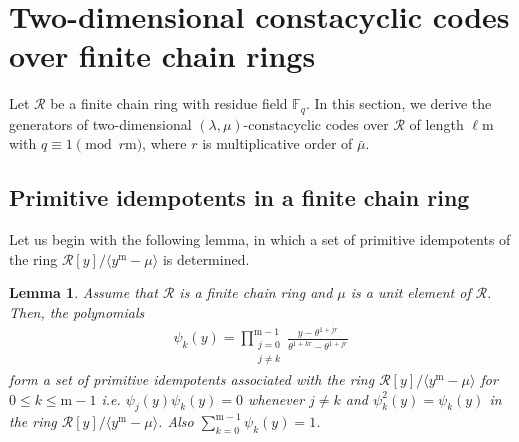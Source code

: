 \documentclass[12pt,a4paper]{article}
\newtheorem{lemma}[theorem]{Lemma}
\begin{document}
\section{Two-dimensional constacyclic codes over finite chain rings}
Let $\mathcal{R}$ be a finite chain ring with residue field $\mathbb{F}_q$. In this section, we derive the generators of two-dimensional $(\lambda,\mu)$-constacyclic codes over $\mathcal{R}$ of length $\ell\mathrm{m}$ with $q\equiv 1 \pmod{r\mathrm{m}}$, where $r$ is multiplicative order of $\bar{\mu}$.
\subsection{Primitive idempotents in a finite chain ring} 

\medskip
Let us begin with the following lemma, in which a set of primitive idempotents of the ring $\mathcal{R}[y]/ \langle y^{\mathrm{m}}- \mu \rangle$ is determined.
\begin{lemma}
Assume that $\mathcal{R}$ is a finite chain ring and $\mu$ is a unit element of $\mathcal{R}.$ Then, the polynomials
\begin{equation*}
    \begin{aligned}
        \psi_k(y)= \prod_{\substack{j=0\\ j\ne k}}^{\mathrm{m}-1} \frac{y - \theta^{1+jr}}{\theta^{1+kr} - \theta^{1+jr}}
\end{aligned}
\end{equation*}
form a set of primitive idempotents associated with the ring $\mathcal{R}[y]/\langle y^{\mathrm{m}} - \mu\rangle$ for $ 0 \le k \le \mathrm{m} - 1$ i.e. $\psi_j(y)\psi_k(y)=0$ whenever $j \ne k$ and $\psi_k^2(y)=\psi_k(y)$ in the ring $\mathcal{R}[y]/\langle y^{\mathrm{m}} - \mu \rangle$. Also $\sum_{k=0}^{\mathrm{m} - 1} \psi_k(y) = 1$.
\end{lemma}
\end{document}
